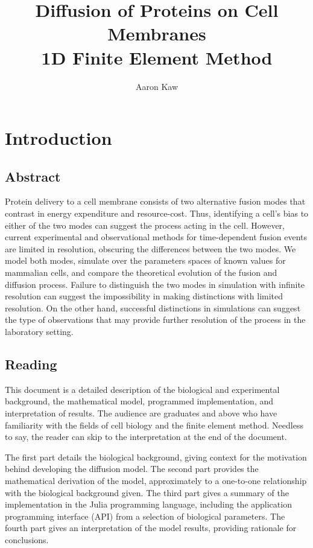 \documentclass{report}
\title{Diffusion of Proteins on Cell Membranes \\ 1D Finite Element Method}
\author{Aaron Kaw}
\date{}
\begin{document}
\maketitle
\tableofcontents

\chapter{Introduction}
\section{Abstract}
Protein delivery to a cell membrane consists of two alternative fusion modes that contrast in energy expenditure and resource-cost. Thus, identifying a cell's bias to either of the two modes can suggest the process acting in the cell. However, current experimental and observational methods for time-dependent fusion events are limited in resolution, obscuring the differences between the two modes. We model both modes, simulate over the parameters spaces of known values for mammalian cells, and compare the theoretical evolution of the fusion and diffusion process. Failure to distinguish the two modes in simulation with infinite resolution can suggest the impossibility in making distinctions with limited resolution. On the other hand, successful distinctions in simulations can suggest the type of observations that may provide further resolution of the process in the laboratory setting.

\section{Reading}
This document is a detailed description of the biological and experimental background, the mathematical model, programmed implementation, and interpretation of results. The audience are graduates and above who have familiarity with the fields of cell biology and the finite element method. Needless to say, the reader can skip to the interpretation at the end of the document.

The first part details the biological background, giving context for the motivation behind developing the diffusion model.
The second part provides the mathematical derivation of the model, approximately to a one-to-one relationship with the biological background given.
The third part gives a summary of the implementation in the Julia programming language, including the application programming interface (API) from a selection of biological parameters.
The fourth part gives an interpretation of the model results, providing rationale for conclusions.
\end{document}
